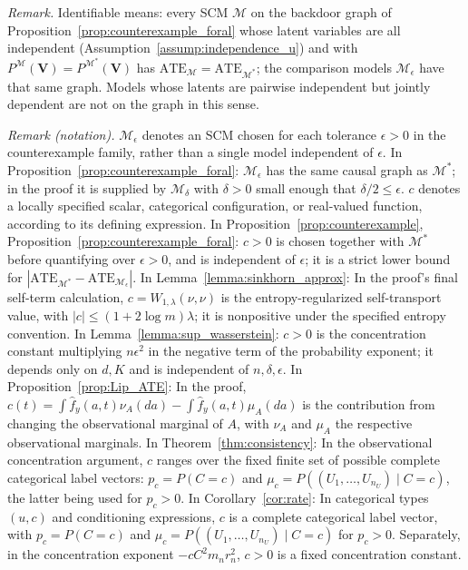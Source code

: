 \documentclass[12pt]{article}
\theoremstyle{plain}
\theoremstyle{definition}
\theoremstyle{remark}
\begin{document}
\noindent\textit{Remark.} Identifiable means: every SCM $\mathcal M$ on the backdoor graph of Proposition~\ref{prop:counterexample_foral} whose latent variables are all independent (Assumption~\ref{assump:independence_u}) and with $P^{\mathcal M}(\boldsymbol V)=P^{\mathcal M^*}(\boldsymbol V)$ has $\text{ATE}_{\mathcal M}=\text{ATE}_{\mathcal M^*}$; the comparison models $\mathcal M_\epsilon$ have that same graph. Models whose latents are pairwise independent but jointly dependent are not on the graph in this sense.

\noindent\textit{Remark (notation).} $\mathcal{M}_\epsilon$ denotes an SCM chosen for each tolerance $\epsilon>0$ in the counterexample family, rather than a single model independent of $\epsilon$. In Proposition~\ref{prop:counterexample_foral}: $\mathcal{M}_\epsilon$ has the same causal graph as $\mathcal{M}^*$; in the proof it is supplied by $\mathcal{M}_\delta$ with $\delta>0$ small enough that $\delta/2\leqslant\epsilon$. $c$ denotes a locally specified scalar, categorical configuration, or real-valued function, according to its defining expression. In Proposition~\ref{prop:counterexample}, Proposition~\ref{prop:counterexample_foral}: $c>0$ is chosen together with $\mathcal{M}^*$ before quantifying over $\epsilon>0$, and is independent of $\epsilon$; it is a strict lower bound for $|\text{ATE}_{\mathcal{M}^*}-\text{ATE}_{\mathcal{M}_\epsilon}|$. In Lemma~\ref{lemma:sinkhorn_approx}: In the proof's final self-term calculation, $c=W_{1,\lambda}(\nu,\nu)$ is the entropy-regularized self-transport value, with $|c|\leqslant(1+2\log m)\lambda$; it is nonpositive under the specified entropy convention. In Lemma~\ref{lemma:sup_wasserstein}: $c>0$ is the concentration constant multiplying $n\epsilon^2$ in the negative term of the probability exponent; it depends only on $d,K$ and is independent of $n,\delta,\epsilon$. In Proposition~\ref{prop:Lip_ATE}: In the proof, $c(t)=\int\hat f_y(a,t)\nu_A(da)-\int\hat f_y(a,t)\mu_A(da)$ is the contribution from changing the observational marginal of $A$, with $\nu_A$ and $\mu_A$ the respective observational marginals. In Theorem~\ref{thm:consistency}: In the observational concentration argument, $c$ ranges over the fixed finite set of possible complete categorical label vectors: $p_c=P(C=c)$ and $\mu_c=P((U_1,\ldots,U_{n_U})\mid C=c)$, the latter being used for $p_c>0$. In Corollary~\ref{cor:rate}: In categorical types $(u,c)$ and conditioning expressions, $c$ is a complete categorical label vector, with $p_c=P(C=c)$ and $\mu_c=P((U_1,\ldots,U_{n_U})\mid C=c)$ for $p_c>0$. Separately, in the concentration exponent $-cC^2m_nr_n^2$, $c>0$ is a fixed concentration constant.
\end{document}
